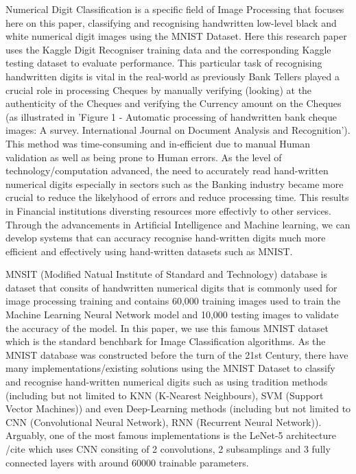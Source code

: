 \documentclass[11pt]{article}
\begin{document}
\vspace{1em}
Numerical Digit Classification is a specific field of Image Processing that focuses here on this paper, classifying and recognising handwritten low-level black and white numerical digit images using the MNIST Dataset. Here this research paper uses the Kaggle Digit Recogniser training data \cite{kaggle-train-digits} and the corresponding Kaggle testing dataset \cite{kaggle-test-digits} to evaluate performance. This particular task of recognising handwritten digits is vital in the real-world as previously Bank Tellers played a crucial role in processing Cheques by manually verifying (looking) at the authenticity of the Cheques and verifying the Currency amount on the Cheques (as illustrated in 'Figure 1 - Automatic processing of handwritten bank cheque images: A survey. International Journal on Document Analysis and Recognition'). This method was time-consuming and in-efficient due to manual Human validation as well as being prone to Human errors. As the level of technology/computation advanced, the need to accurately read hand-written numerical digits especially in sectors such as the Banking industry became more crucial to reduce the likelyhood of errors and reduce processing time. This results in Financial institutions diversting resources more effectivly to other services. Through the advancements in Artificial Intelligence and Machine learning, we can develop systems that can accuracy recognise hand-written digits much more efficient and effectively using hand-written datasets such as MNIST.

\vspace{1em}
MNSIT (Modified Natual Institute of Standard and Technology) database is dataset that consits of handwritten numerical digits that is commonly used for image processing training and contains 60,000 training images used to train the Machine Learning Neural Network model and 10,000 testing images to validate the accuracy of the model. In this paper, we use this famous MNIST dataset which is the standard benchbark for Image Classification algorithms. As the MNIST database was constructed before the turn of the 21st Century, there have many implementations/existing solutions using the MNIST Dataset to classify and recognise hand-written numerical digits such as using tradition methods (including but not limited to KNN (K-Nearest Neighbours), SVM (Support Vector Machines)) and even Deep-Learning methods (including but not limited to CNN (Convolutional Neural Network), RNN (Recurrent Neural Network)). Arguably, one of the most famous implementations is the LeNet-5 architecture /cite{} which uses CNN consiting of 2 convolutions, 2 subsamplings and 3 fully connected layers with around 60000 trainable parameters.
\end{document}
